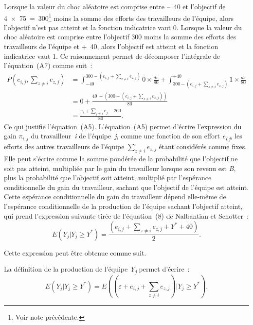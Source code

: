 \begin{Article}
\begin{refsection}[Lebourges]
\begin{appendices}
Lorsque la valeur du choc aléatoire est comprise entre --~40 et
l'objectif de 4~×~75~=~300\footnote{Voir note précédente.} moins la
somme des efforts des travailleurs de l'équipe, alors l'objectif n'est
pas atteint et la fonction indicatrice vaut 0. Lorsque la valeur du choc
aléatoire est comprise entre l'objectif 300 moins la somme des efforts
des travailleurs de l'équipe et +~40, alors l'objectif est atteint et la
fonction indicatrice vaut 1. Ce raisonnement permet de décomposer
l'intégrale de l'équation~(A7) comme suit~:
\begin{align}
P\left( e_{i,j},\sum_{z \neq i}^{}e_{z,j} \right) &= \int_{- 40}^{300 - \left( e_{i,j} + \sum_{z \neq i}^{}e_{z,j} \right)}{0 \times \frac{d\varepsilon}{80} + \int_{300 - \left( e_{i,j} + \sum_{z \neq i}^{}e_{z,j} \right)}^{+ 40}{1 \times \frac{d\varepsilon}{80}}} \nonumber \\
&= 0 + \frac{40\  - \left( 300 - \left( e_{i,j} + \sum_{z \neq i}^{}e_{z,j} \right) \right)}{80} \\
&= \frac{e_{i} + \sum_{j \neq i}^{}e_{j} - 260}{80}.\nonumber
\end{align}
Ce qui justifie l'équation~(A5). L'équation~(A5) permet d'écrire
l'expression du gain $\pi_{i,j}$ du
travailleur~\emph{i} de l'équipe~\emph{j}, comme une fonction de son
effort \emph{e\textsubscript{i}}\textsubscript{,\emph{j}}, les efforts
des autres travailleurs de l'équipe \(\sum_{z \neq i}^{}e_{z,j}\) étant
considérés comme fixes. Elle peut s'écrire comme la somme pondérée de la
probabilité que l'objectif ne soit pas atteint, multipliée par le gain
du travailleur lorsque son revenu est \emph{B}, plus la probabilité que
l'objectif soit atteint, multiplié par l'espérance conditionnelle du
gain du travailleur, sachant que l'objectif de l'équipe est atteint.
Cette espérance conditionnelle du gain du travailleur dépend elle-même
de l'espérance conditionnelle de la production de l'équipe sachant
l'objectif atteint, qui prend l'expression suivante tirée de
l'équation~(8) de Nalbantian et Schotter~:
\begin{equation}
    E\left( Y_{j}|Y_{j} \geq Y^{*} \right) = \frac{\left( e_{i,j} + \sum_{z \neq i}^{}{e_{z,j} + Y^{*} + 40} \right)}{2}.
\end{equation}

Cette expression peut être obtenue comme suit.

La définition de la production de l'équipe \emph{Y\textsubscript{j}}
permet d'écrire~:
\begin{equation}
    E\left( Y_{j}|Y_{j} \geq Y^{*} \right) = E\left( \left( \varepsilon + e_{i,j} + \sum_{z \neq i}^{}e_{z,j} \right)|Y_{j} \geq Y^{*} \right).
\end{equation}


\end{appendices}
\end{refsection}
\end{Article}
